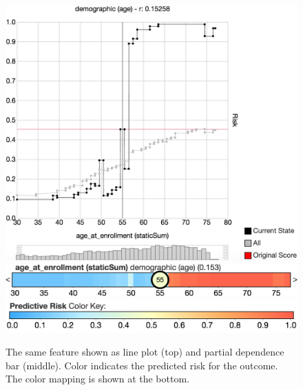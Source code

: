 \begin{figure}[t]
\centering
\includegraphics[width=0.8\linewidth]{prospector/compress_1} \\  \vspace*{0.2em} %
\includegraphics[width=0.9\linewidth]{prospector/compress_2} \\  \vspace*{0.5em} %
\includegraphics[width=0.7\linewidth]{prospector/color_scale} %
\caption{
The same feature shown as line plot (top) and partial dependence bar (middle).
Color indicates the predicted risk for the outcome.
The color mapping is shown at the bottom.
}
\label{figs:compress}
\end{figure}